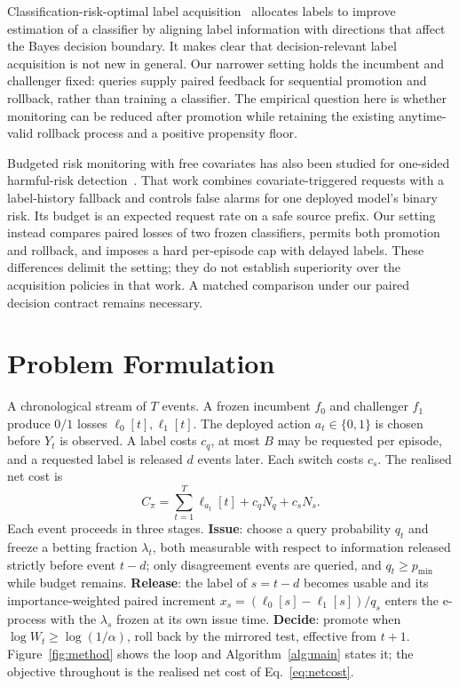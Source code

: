 \documentclass{article}
\begin{document}
Classification-risk-optimal label acquisition~\cite{setoudehtazangi2026classificationrisk}
allocates labels to improve estimation of a classifier by aligning label information with
directions that affect the Bayes decision boundary. It makes clear that decision-relevant label
acquisition is not new in general. Our narrower setting holds the incumbent and challenger fixed:
queries supply paired feedback for sequential promotion and rollback, rather than training a
classifier. The empirical question here is whether monitoring can be reduced after promotion while
retaining the existing anytime-valid rollback process and a positive propensity floor.

Budgeted risk monitoring with free covariates has also been studied for one-sided harmful-risk
detection~\cite{cao2026freecovariates}. That work combines covariate-triggered requests with a
label-history fallback and controls false alarms for one deployed model's binary risk. Its budget
is an expected request rate on a safe source prefix. Our setting instead compares paired losses of
two frozen classifiers, permits both promotion and rollback, and imposes a hard per-episode cap
with delayed labels. These differences delimit the setting; they do not establish superiority over
the acquisition policies in that work. A matched comparison under our paired decision contract
remains necessary.

\section{Problem Formulation}
A chronological stream of $T$ events. A frozen incumbent $f_0$ and challenger $f_1$ produce $0/1$
losses $\ell_0[t],\ell_1[t]$. The deployed action $a_t\in\{0,1\}$ is chosen before $Y_t$ is
observed. A label costs $c_q$, at most $B$ may be requested per episode, and a requested label is
released $d$ events later. Each switch costs $c_s$. The realised net cost is
\begin{equation}\label{eq:netcost}
  C_\pi=\sum_{t=1}^{T}\ell_{a_t}[t]+c_qN_q+c_sN_s .
\end{equation}
Each event proceeds in three stages. \textbf{Issue}: choose a query probability $q_t$ and freeze a
betting fraction $\lambda_t$, both measurable with respect to information released strictly before
event $t-d$; only disagreement events are queried, and $q_t\ge p_{\min}$ while budget remains.
\textbf{Release}: the label of $s=t-d$ becomes usable and its importance-weighted paired increment
$x_s=(\ell_0[s]-\ell_1[s])/q_s$ enters the e-process with the $\lambda_s$ frozen at its own issue
time. \textbf{Decide}: promote when $\log W_t\ge\log(1/\alpha)$, roll back by the mirrored test,
effective from $t+1$. Figure~\ref{fig:method} shows the loop and Algorithm~\ref{alg:main} states
it; the objective throughout is the realised net cost of Eq.~\eqref{eq:netcost}.
\end{document}
